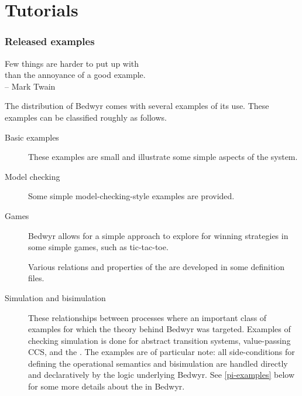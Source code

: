 \part{Tutorials}
\label{tutorials}


\section{Released examples}

\begin{flushright}
Few things are harder to put up with \\
than the annoyance of a good example. \\ -- Mark Twain
\end{flushright}

The distribution of Bedwyr comes with several examples of its use.
These examples can be classified roughly as follows.

\begin{description}
  \item[Basic examples] These examples are small and illustrate some
    simple aspects of the system.

  \item[Model checking] Some simple model-checking-style examples are
    provided.

  \item[Games] Bedwyr allows for a simple approach to explore for
    winning strategies in some simple games, such as tic-tac-toe.

  \item[\lc{}] Various relations and properties of the
    \lc{} are developed in some definition files.

  \item[Simulation and bisimulation] These relationships between
    processes where an important class of examples for which the theory
    behind Bedwyr was targeted.  Examples of checking simulation is done
    for abstract transition systems, value-passing CCS, and the
    \pc{}.  The \pc{} examples are of particular note:
    all side-conditions for defining the operational semantics and
    bisimulation are handled directly and declaratively by the logic
    underlying Bedwyr.  See \autoref{pi-examples} below for some more
    details about the \pc{} in Bedwyr.
\end{description}



